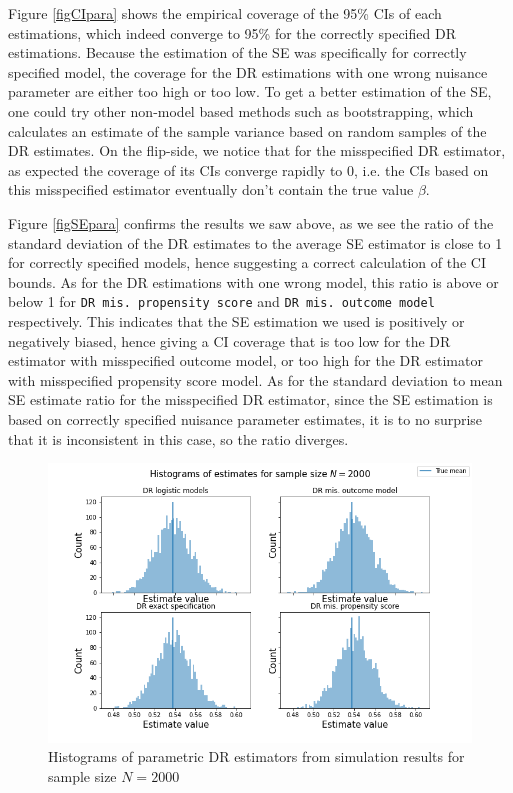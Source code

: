 \documentclass[12pt,twoside]{article}
\begin{document}
Figure \ref{figCIpara} shows the empirical coverage of the 95\% CIs of each estimations, which indeed converge to 95\% for the correctly specified DR estimations. Because the estimation of the SE was specifically for correctly specified model, the coverage for the DR estimations with one wrong nuisance parameter are either too high or too low. To get a better estimation of the SE, one could try other non-model based methods such as bootstrapping, which calculates an estimate of the sample variance based on random samples of the DR estimates. On the flip-side, we notice that for the misspecified DR estimator, as expected the coverage of its CIs converge rapidly to 0, i.e. the CIs based on this misspecified estimator eventually don't contain the true value $\beta$.

Figure \ref{figSEpara} confirms the results we saw above, as we see the ratio of the standard deviation of the DR estimates to the average SE estimator is close to 1 for correctly specified models, hence suggesting a correct calculation of the CI bounds. As for the DR estimations with one wrong model, this ratio is above or below 1 for \texttt{DR mis. propensity score} and \texttt{DR mis. outcome model} respectively. This indicates that the SE estimation we used is positively or negatively biased, hence giving a CI coverage that is too low for the DR estimator with misspecified outcome model, or too high for the DR estimator with misspecified propensity score model. As for the standard deviation to mean SE estimate ratio for the misspecified DR estimator, since the SE estimation is based on correctly specified nuisance parameter estimates, it is to no surprise that it is inconsistent in this case, so the ratio diverges.

\begin{figure}[h!]
    \centering
    \includegraphics[width = 0.9\columnwidth]{figures/histpara.png}
    \caption{Histograms of parametric DR estimators from simulation results for sample size $N = 2000$}
    \label{fighistpara}
\end{figure}
\end{document}
